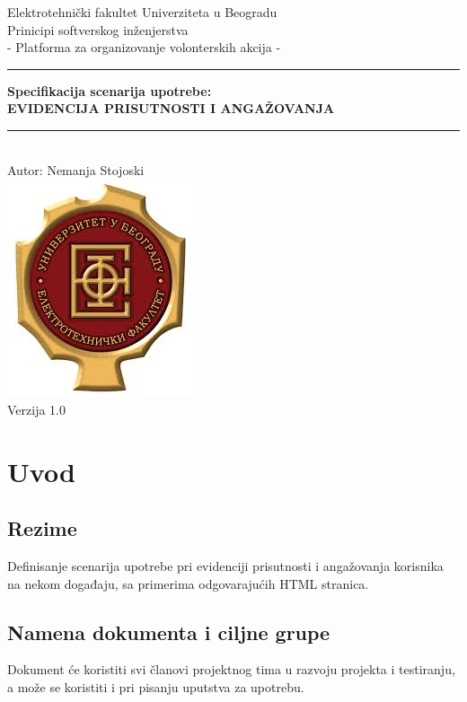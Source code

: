 \documentclass[11pt,a4paper]{article}
\begin{document}
\begin{titlepage}

\centering
\textnormal{\large Elektrotehnički fakultet Univerziteta u Beogradu}\\[0.1cm]
\textnormal{\large Prinicipi softverskog inženjerstva}\\[3cm]

\textnormal{\normalsize - Platforma za organizovanje volonterskih akcija -}\\\vspace{-5mm}
\rule{\textwidth}{0.4pt}
{\huge \bfseries Specifikacija scenarija upotrebe:\\ 
EVIDENCIJA PRISUTNOSTI I ANGAŽOVANJA\par}\vspace{-1mm}
\rule{\textwidth}{0.4pt}\\\vspace{1mm}
\textnormal{\large Autor: Nemanja Stojoski}\\[6cm]

\includegraphics[scale=0.5]{logo.jpg}\\
\vfill
\textnormal{\normalsize Verzija 1.0}\\

\end{titlepage}

\tableofcontents

\newpage

\section{Uvod}
\subsection{Rezime}
Definisanje scenarija upotrebe pri evidenciji prisutnosti i angažovanja korisnika na nekom događaju, sa primerima odgovarajućih HTML stranica.
\subsection{Namena dokumenta i ciljne grupe}
Dokument će koristiti svi članovi projektnog tima u razvoju projekta i testiranju, a može se koristiti i pri pisanju uputstva za upotrebu.
\end{document}
